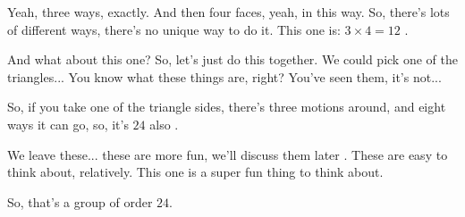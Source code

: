 \begin{speech}[00:35:50 - 00:36:52]
Yeah, three ways, exactly. And then four faces, yeah, in this way. So, there's lots of different ways, there's no unique way to do it. This one is: $3 \times 4 = 12$ .

And what about this one?  So, let's just do this together. We could pick one of the triangles... You know what these things are, right? You've seen them, it's not...

So, if you take one of the triangle sides, there's three motions around, and eight ways it can go, so, it's $24$ also .

We leave these... these are more fun, we'll discuss them later . These are easy to think about, relatively. This one is a super fun thing to think about.

So, that's a group of order $24$.
\end{speech}

